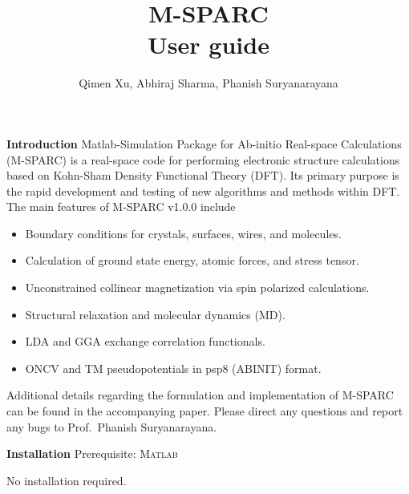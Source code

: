\documentclass[xcolor=dvipsnames,t]{beamer}
\title[] {M-SPARC  \\ {\small User guide}}
\author{Qimen Xu, Abhiraj Sharma, Phanish Suryanarayana}
\institute[]
{
Material Physics \& Mechanics Group \\
Georgia Institute of Technology
}
\date{}
\let\otp\titlepage
\renewcommand{\titlepage}{\otp\addtocounter{framenumber}{-1}}
\begin{document}

\begin{frame}[plain]
 \titlepage
\end{frame}


\begin{frame}[allowframebreaks]{\textbf{Introduction}} \label{Introduction}
Matlab-Simulation Package for Ab-initio Real-space Calculations (M-SPARC) is a real-space code for performing electronic structure calculations based on Kohn-Sham Density Functional Theory (DFT). Its primary purpose is the rapid development and testing of new algorithms and methods within DFT. The main features of M-SPARC v1.0.0 include
\begin{itemize}
  \item Boundary conditions for crystals, surfaces, wires, and molecules. 
  \item Calculation of ground state energy, atomic forces, and stress tensor.
  \item Unconstrained collinear magnetization via spin polarized calculations.
  \item Structural relaxation and molecular dynamics (MD). 
  \item LDA and GGA exchange correlation functionals. 
  \item ONCV and TM pseudopotentials in psp8 (ABINIT) format. 
\end{itemize}
Additional details regarding the formulation and implementation of M-SPARC can be found in the accompanying paper. Please direct any questions and report any bugs to Prof.~Phanish Suryanarayana.

\end{frame}


\begin{frame}{\textbf{Installation}} \label{Installation}
Prerequisite: \textsc{Matlab}

No installation required.
\end{frame}
\end{document}
